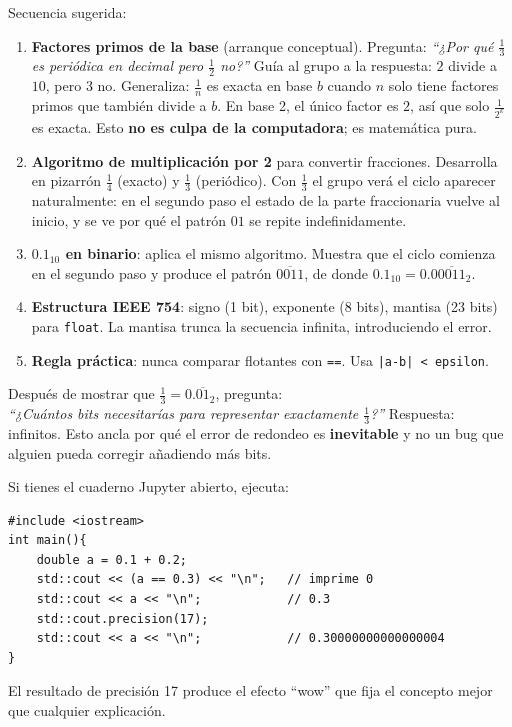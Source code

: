 \documentclass[12pt, oneside]{article}
\begin{document}
Secuencia sugerida:
\begin{enumerate}
  \item \textbf{Factores primos de la base} (arranque conceptual).
        Pregunta: \textit{``¿Por qué $\frac{1}{3}$ es periódica en
        decimal pero $\frac{1}{2}$ no?''} Guía al grupo a la respuesta:
        $2$ divide a $10$, pero $3$ no. Generaliza: $\frac{1}{n}$ es
        exacta en base $b$ cuando $n$ solo tiene factores primos que
        también divide a $b$. En base 2, el único factor es $2$, así que
        solo $\frac{1}{2^k}$ es exacta.
        Esto \textbf{no es culpa de la computadora}; es matemática pura.

  \item \textbf{Algoritmo de multiplicación por 2} para convertir
        fracciones. Desarrolla en pizarrón $\frac{1}{4}$ (exacto) y
        $\frac{1}{3}$ (periódico). Con $\frac{1}{3}$ el grupo verá el
        ciclo aparecer naturalmente: en el segundo paso el estado de la
        parte fraccionaria vuelve al inicio, y se ve por qué el patrón
        $01$ se repite indefinidamente.

  \item \textbf{$0.1_{10}$ en binario}: aplica el mismo algoritmo.
        Muestra que el ciclo comienza en el segundo paso y produce el
        patrón $\overline{0011}$, de donde $0.1_{10} = 0.0\overline{0011}_2$.

  \item \textbf{Estructura IEEE 754}: signo (1 bit), exponente (8 bits),
        mantisa (23 bits) para \texttt{float}. La mantisa trunca la
        secuencia infinita, introduciendo el error.

  \item \textbf{Regla práctica}: nunca comparar flotantes con \texttt{==}.
        Usa \texttt{|a-b| < epsilon}.
\end{enumerate}

\begin{notaprofesor}
  Después de mostrar que $\frac{1}{3} = 0.\overline{01}_2$, pregunta:\\
  \textit{``¿Cuántos bits necesitarías para representar exactamente
  $\frac{1}{3}$?''} Respuesta: infinitos. Esto ancla por qué el error
  de redondeo es \textbf{inevitable} y no un bug que alguien pueda
  corregir añadiendo más bits.
\end{notaprofesor}

\begin{notaprofesor}
  Si tienes el cuaderno Jupyter abierto, ejecuta:
\begin{verbatim}
#include <iostream>
int main(){
    double a = 0.1 + 0.2;
    std::cout << (a == 0.3) << "\n";   // imprime 0
    std::cout << a << "\n";            // 0.3
    std::cout.precision(17);
    std::cout << a << "\n";            // 0.30000000000000004
}
\end{verbatim}
  El resultado de precisión 17 produce el efecto ``wow'' que fija el
  concepto mejor que cualquier explicación.
\end{notaprofesor}
\end{document}
